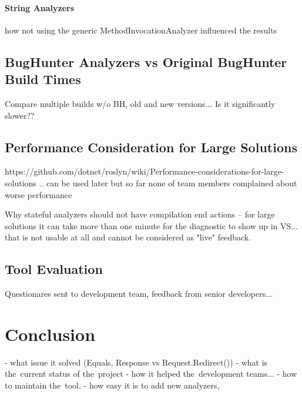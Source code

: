 \documentclass[
  digital, %
  table,   %
  lof,     %
  lot,     %
  oneside,
]{fithesis3}
\begin{document}
\subsubsection{String Analyzers}
how not using the generic MethodInvocationAnalyzer influenced the results

\section{BugHunter Analyzers vs Original BugHunter Build Times}
Compare multiple builds w/o BH, old and new versions... Is it significantly slower??

\section{Performance Consideration for Large Solutions}
https://github.com/dotnet/roslyn/wiki/Performance-considerations-for-large-solutions
.. can be used later but so far none of team members complained about worse performance

Why stateful analyzers should not have compilation end actions -- for large solutions it can take more than one minute for the diagnostic to show up in VS... that is not usable at all and cannot be considered as "live" feedback.

\section{Tool Evaluation}
Questionares sent to development team, feedback from senior developers...

\chapter{Conclusion}
  - what issue it solved (Equals, Response vs Request.Redirect())
  - what is the~current status of the~project
  - how it helped the~development teams...
  - how to maintain the~tool, 
  - how easy it is to add new analyzers, 
\end{document}

